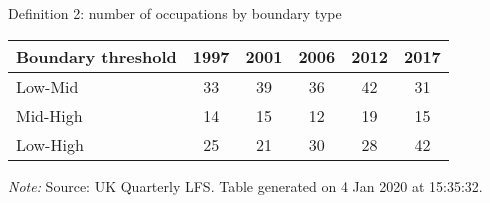 \begin{center}
\begin{threeparttable}[!h]
\caption{Definition 2: number of occupations by boundary type}
\label{tab:shareBound}
\begin{tabular}{lccccc}
\toprule
\toprule
\textbf{Boundary threshold}&\multicolumn{1}{c}{\textbf{1997}}&\multicolumn{1}{c}{\textbf{2001}}&\multicolumn{1}{c}{\textbf{2006}}&\multicolumn{1}{c}{\textbf{2012}}&\multicolumn{1}{c}{\textbf{2017}} \\
\midrule
Low-Mid     &          33&          39&          36&          42&          31\\
Mid-High    &          14&          15&          12&          19&          15\\
Low-High    &          25&          21&          30&          28&          42\\
\bottomrule
\bottomrule
\end{tabular}
\begin{tablenotes}
\item\footnotesize\textit{Note:} Source: UK Quarterly LFS. Table generated on  4 Jan 2020 at 15:35:32.
\end{tablenotes}
\end{threeparttable}
\end{center}
